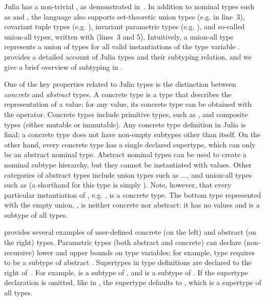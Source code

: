 Julia has a non-trivial , as
demonstrated in~. In addition to nominal types such
as  and , the language also supports set-theoretic union
types (e.g.  in line~3),
covariant tuple types (e.g. ),
invariant parametric types (e.g. ),
and so-called union-all types, written with  (lines~3 and 5).
Intuitively, a union-all type  represents a union of types
 for all valid instantiations  of the type variable .
\citet{TODO} provides a detailed
account of Julia types and their subtyping relation, and we give a brief
overview of subtyping in .

One of the key properties related to Julia types is the distinction between
\emph{concrete} and \emph{abstract} types. A concrete type is a type that
describes the representation of a value; for any value, its concrete type can be
obtained with the  operator. Concrete types include primitive types,
such as , and composite  types (either mutable or
immutable). Any concrete type definition in Julia is final: a concrete type does
not have non-empty subtypes other than itself.
On the other hand, every concrete type has a single
declared supertype, which can only be an abstract nominal type.
Abstract nominal types can be used
to create a nominal subtype hierarchy, but they cannot be instantiated with
values. Other categories of abstract types include union types
such as $\ldots$, and union-all types
such as  (a shorthand for this type 
is simply ). Note, however, that every particular instantiation of
, e.g. , is a concrete type.
The bottom type represented with the empty union, , is neither
concrete nor abstract: it has no values and is a subtype of all types.

 provides several examples of user-defined
concrete (on the left) and abstract (on the right) types. Parametric types (both
abstract and concrete) can declare (non-recursive) lower and upper bounds on type variables;
for example, type  requires  to be a subtype of
abstract .
Supertypes in type definitions are declared to the right of~\cjl{<:}.
For example,  is a subtype of , and  is a
subtype of . If the supertype declaration is omitted, like in
, the supertype defaults to ,
which is a supertype of all types.


